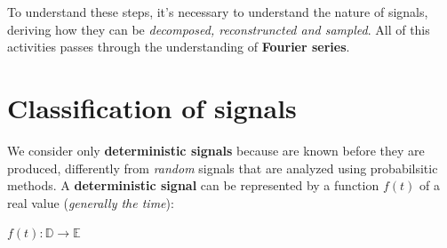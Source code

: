 \documentclass[10pt,a4paper]{report}
\theoremstyle{definition}
\begin{document}
To understand these steps, it's necessary to understand the nature of signals, deriving how they can be \textit{decomposed, reconstruncted and sampled}. All of this activities passes through the understanding of \textbf{Fourier series}.
\section{Classification of signals}\label{sec:classification-of-signals}
We consider only \textbf{deterministic signals} because are known before they are produced, differently from \textit{random} signals that are analyzed using probabilsitic methods.
A \textbf{deterministic signal} can be represented by a function $f(t)$ of a real value (\textit{generally the time}):
\begin{center}
	$f(t): \mathbb{D} \rightarrow \mathbb{E}$
\end{center}
\end{document}
